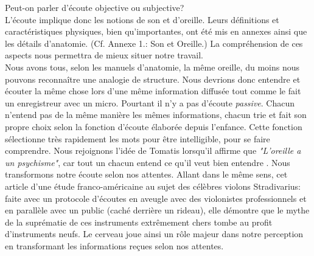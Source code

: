 Peut-on parler d'écoute objective ou subjective?
\\
L'écoute implique donc les notions de son et
d'oreille. Leurs définitions et caractéristiques physiques, bien qu'importantes, ont été mis en
annexes ainsi que les détails
d'anatomie. (Cf. Annexe 1.: Son et Oreille.)
La compréhension de ces aspects nous
permettra de mieux situer notre travail.
\\
Nous avons tous,
selon les manuels d'anatomie, la même
oreille, du moins nous pouvons reconnaître une analogie de structure. Nous devrions donc entendre et écouter la même chose
lors d'une même information diffusée tout comme le fait un enregistreur avec un micro. Pourtant il n'y a pas d'écoute \emph{passive}. Chacun n'entend pas de la même manière les mêmes
informations, chacun trie et fait son propre choix selon la fonction
d'écoute élaborée depuis l'enfance. Cette fonction sélectionne très
rapidement les mots pour être intelligible, pour se faire
comprendre. Nous rejoignons l'idée de Tomatis lorsqu'il affirme que
\textit{"L'oreille a un psychisme"}, car tout un chacun entend ce qu'il veut bien
entendre \autocite [167]{tomatis_oreille_1987}.
Nous transformons notre écoute selon nos attentes.
Allant dans le même sens, cet
article d'une
étude franco-américaine \autocite{lemonde.fr:stradivarius} au sujet des célèbres violons
Stradivarius: faite avec un protocole
d'écoutes en aveugle avec
des violonistes professionnels et en parallèle avec un public (caché
derrière un rideau), elle démontre que le mythe de la suprématie
de ces instruments extrêmement chers tombe au profit d'instruments
neufs. Le cerveau  joue ainsi un
rôle majeur dans notre perception en 
transformant les informations reçues selon nos attentes.
%
